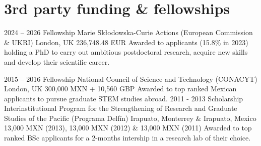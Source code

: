 \documentclass[]{friggeri-cv} %
\begin{document}
%
%
%
%
%


\section{3rd party funding \& fellowships}

\begin{entrylist}
\entry
{2024 -- 2026}
{Fellowship}
{Marie Skłodowska-Curie Actions (European Commission \& UKRI)}
{London, UK}
{236,748.48 EUR}
{Awarded to applicants (15.8\% in 2023) holding a PhD to carry out ambitious postdoctoral research, acquire new skills and develop their scientific career.}

\entry
{2015 -- 2016}
{Fellowship}
{National Council of Science and Technology (CONACYT)}
{London, UK}
{300,000 MXN + 10,560 GBP}
{Awarded to top ranked Mexican applicants to pursue graduate STEM studies abroad.}
\entry
{2011 - 2013}
{Scholarship}
{Interinstitutional Program for the Strengthening of Research and Graduate Studies of the Pacific (Programa Delfín)}
{Irapuato, Monterrey \& Irapuato, Mexico}
{13,000 MXN (2013), 13,000 MXN (2012) \& 13,000 MXN (2011)}
{Awarded to top ranked BSc applicants for a 2-months intership in a research lab of their choice.}
\end{entrylist}
\end{document}
